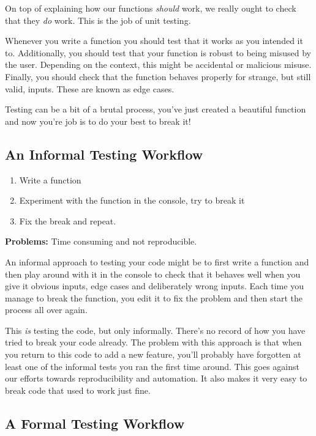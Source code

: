 \documentclass[
  12pt,
]{book}
\providecommand{\tightlist}{%
  \setlength{\itemsep}{0pt}\setlength{\parskip}{0pt}}
\begin{document}
On top of explaining how our functions \emph{should} work, we really ought to check that they \emph{do} work. This is the job of unit testing.

Whenever you write a function you should test that it works as you intended it to. Additionally, you should test that your function is robust to being misused by the user. Depending on the context, this might be accidental or malicious misuse. Finally, you should check that the function behaves properly for strange, but still valid, inputs. These are known as edge cases.

Testing can be a bit of a brutal process, you've just created a beautiful function and now you're job is to do your best to break it!

\hypertarget{an-informal-testing-workflow}{%
\subsection{An Informal Testing Workflow}\label{an-informal-testing-workflow}}

\begin{enumerate}
\def\labelenumi{\arabic{enumi}.}
\tightlist
\item
  Write a function
\item
  Experiment with the function in the console, try to break it
\item
  Fix the break and repeat.
\end{enumerate}

\textbf{Problems:} Time consuming and not reproducible.

An informal approach to testing your code might be to first write a function and then play around with it in the console to check that it behaves well when you give it obvious inputs, edge cases and deliberately wrong inputs. Each time you manage to break the function, you edit it to fix the problem and then start the process all over again.

This \emph{is} testing the code, but only informally. There's no record of how you have tried to break your code already. The problem with this approach is that when you return to this code to add a new feature, you'll probably have forgotten at least one of the informal tests you ran the first time around. This goes against our efforts towards reproducibility and automation. It also makes it very easy to break code that used to work just fine.

\hypertarget{a-formal-testing-workflow}{%
\subsection{A Formal Testing Workflow}\label{a-formal-testing-workflow}}
\end{document}
